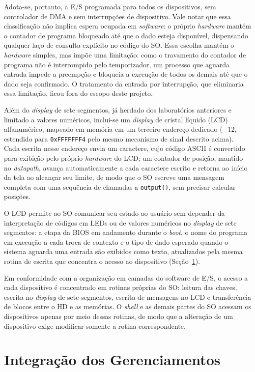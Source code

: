 \documentclass[
	12pt,				%
	openright,			%
	a4paper,			%
	english,			%
	french,				%
	spanish,			%
	brazilian,				%
	]{abntex2}
\begin{document}
Adota-se, portanto, a E/S programada para todos os dispositivos, sem controlador de
DMA e sem interrupções de dispositivo. Vale notar que essa classificação não implica
espera ocupada em \emph{software}: o próprio \emph{hardware} mantém o contador de
programa bloqueado até que o dado esteja disponível, dispensando qualquer laço de
consulta explícito no código do SO. Essa escolha mantém o \emph{hardware} simples,
mas impõe uma limitação: como o travamento do contador de programa não é interrompido
pelo temporizador, um processo que aguarda entrada impede a preempção e bloqueia a
execução de todos os demais até que o dado seja confirmado. O tratamento da entrada
por interrupção, que eliminaria essa limitação, ficou fora do escopo deste projeto.

Além do \emph{display} de sete segmentos, já herdado dos laboratórios anteriores e
limitado a valores numéricos, inclui-se um \emph{display} de cristal líquido (LCD)
alfanumérico, mapeado em memória em um terceiro endereço dedicado ($-12$, estendido
para \texttt{0xFFFFFFF4} pelo mesmo mecanismo de sinal descrito acima). Cada escrita
nesse endereço envia um caractere, cujo código ASCII é convertido para exibição pelo
próprio \emph{hardware} do LCD; um contador de posição, mantido no \emph{datapath},
avança automaticamente a cada caractere escrito e retorna ao início da tela ao
alcançar seu limite, de modo que o SO escreve uma mensagem completa com uma
sequência de chamadas a \texttt{output()}, sem precisar calcular posições.

O LCD permite ao SO comunicar seu estado ao usuário sem depender da interpretação
de códigos em LEDs ou de valores numéricos no \emph{display} de sete segmentos:
a etapa da BIOS em andamento durante o \emph{boot}, o nome do programa em execução
a cada troca de contexto e o tipo de dado esperado quando o sistema aguarda uma
entrada são exibidos como texto, atualizados pela mesma rotina de escrita que
concentra o acesso ao dispositivo (Seção~\ref{sec:integracao}).

Em conformidade com a organização em camadas do software de E/S, o acesso a cada
dispositivo é concentrado em rotinas próprias do SO: leitura das chaves, escrita no
\emph{display} de sete segmentos, escrita de mensagens no LCD e transferência de
blocos entre o HD e as memórias. O \emph{shell} e as
demais partes do SO acessam os dispositivos apenas por meio dessas rotinas, de modo
que a alteração de um dispositivo exige modificar somente a rotina correspondente.


\section{Integração dos Gerenciamentos}
\label{sec:integracao}
\end{document}
